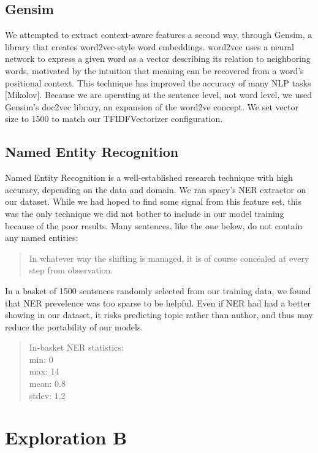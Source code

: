 \documentclass[12pt]{article}
\begin{document}
\subsection{Gensim}
We attempted to extract context-aware features a second way, through Gensim, a library that creates word2vec-style word embeddings. word2vec uses a neural network to express a given word as a vector describing its relation to neighboring words, motivated by the intuition that meaning can be recovered from a word's positional context. This technique has improved the accuracy of many NLP tasks [Mikolov]. Because we are operating at the sentence level, not word level, we used Gensim's doc2vec library, an expansion of the word2ve concept. We set vector size to 1500 to match our TFIDFVectorizer configuration.

\subsection{Named Entity Recognition}
Named Entity Recognition is a well-established research technique with high accuracy, depending on the data and domain. We ran spacy's NER extractor on our dataset. While we had hoped to find some signal from this feature set, this was the only technique we did not bother to include in our model training because of the poor results. Many sentences, like the one below, do not contain any named entities:

\begin{quote}
In whatever way the shifting is managed, it is of course concealed at every step from observation.
\end{quote}

In a basket of 1500 sentences randomly selected from our training data, we found that NER prevelence was too sparse to be helpful. Even if NER had had a better showing in our dataset, it risks predicting topic rather than author, and thus may reduce the portability of our models.

\begin{quote}
In-basket NER statistics:\\
min: 0 \\
max: 14 \\
mean: 0.8 \\
stdev: 1.2\\
\end{quote}


\section{Exploration B}
\end{document}
